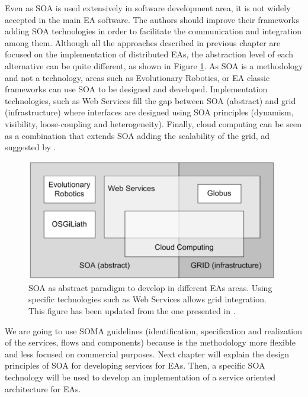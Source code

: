 Even as SOA is used extensively in software development area, it is
not widely accepted in the main EA software. %
The authors should improve their frameworks adding SOA technologies in
order to facilitate the communication and integration among them. %
 Although all the approaches described in previous chapter are focused
 on the implementation of distributed EAs, the abstraction level of
 each alternative can be quite different, as shown in Figure
 \ref{fig:soagrid}.  As SOA is a methodology and not a technology,
 areas such as Evolutionary Robotics, or EA classic frameworks can use
 SOA to be designed and developed. Implementation technologies, such
 as Web Services fill the gap between SOA (abstract) and grid
 (infrastructure) where interfaces are designed using SOA principles
 (dynamism, visibility, loose-coupling and heterogeneity). Finally,
 cloud computing can be seen as a combination that extends SOA adding
 the scalability of the grid, ad suggested by 
 \citep{SOALIB}. %


\begin{figure}
\centering
\includegraphics[width=26pc]{gfx/soa/soagrid.png}
\caption{SOA as abstract paradigm to develop in different EAs
  areas. %
 Using specific technologies such as Web Services allows grid integration. This figure has been updated from the one presented in \cite{SOALIB}.}
\label{fig:soagrid}
\end{figure}
We are going to use SOMA guidelines (identification, specification and
realization of the services, flows and components) because is the
methodology more flexible and less focused on commercial
purposes. Next chapter will explain the design principles of SOA for
developing services for EAs. Then, a specific SOA technology will be
used to develop an implementation of a service oriented architecture
for EAs.
